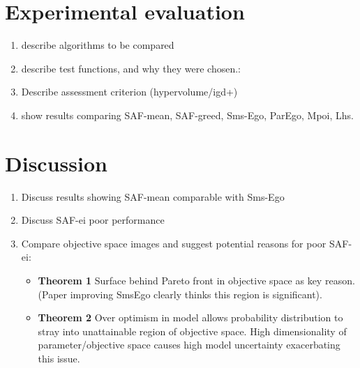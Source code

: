 \documentclass[runningheads]{llncs}
\begin{document}
\clearpage


\section{Experimental evaluation}
\begin{enumerate}
    \item describe algorithms to be compared
    \item describe test functions, and why they were chosen.:
        

\item Describe assessment criterion (hypervolume/igd+)
\item show results comparing SAF-mean, SAF-greed, Sms-Ego, ParEgo, Mpoi, Lhs.
\end{enumerate}

\section{Discussion}
\begin{enumerate}
    \item Discuss results showing SAF-mean comparable with Sms-Ego
    \item Discuss SAF-ei poor performance
    \item Compare objective space images and suggest potential reasons for poor SAF-ei:
        \begin{itemize}
            \item \textbf{Theorem 1} Surface behind Pareto front in objective space as key reason. (Paper improving SmsEgo clearly thinks this region is significant).  
            \item \textbf{Theorem 2} Over optimism in model allows probability distribution to stray into unattainable region of objective space. High dimensionality of parameter/objective space causes high model uncertainty exacerbating this issue. 
        \end{itemize}
\end{enumerate}
\end{document}
